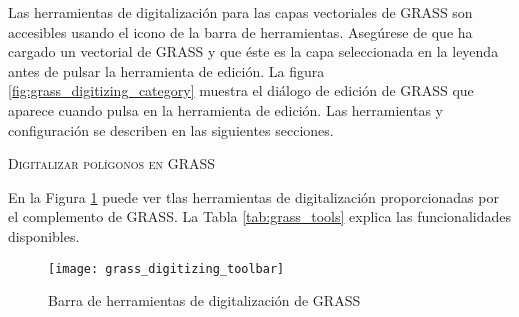 Las herramientas de digitalización para las capas vectoriales de GRASS son accesibles usando el icono  
de la barra de herramientas. Asegúrese de que ha cargado un vectorial de GRASS y que éste es la capa seleccionada en 
la leyenda antes de pulsar la herramienta de edición. La figura \ref{fig:grass_digitizing_category} muestra el diálogo
de edición de GRASS que aparece cuando pulsa en la herramienta de edición. Las herramientas y configuración se describen en las siguientes secciones.

\begin{Tip}\caption{\textsc{Digitalizar polígonos en GRASS}}
\end{Tip} 

\label{label_grasstoolbar}

En la Figura \ref{fig:grass_digitizing_toolbar} puede ver tlas herramientas de digitalización proporcionadas por el complemento de GRASS. La Tabla \ref{tab:grass_tools}
explica las funcionalidades disponibles.

\begin{figure}[h]
   \begin{center}
   \caption{Barra de herramientas de digitalización de GRASS \nixcaption}\label{fig:grass_digitizing_toolbar} 
   \texttt{[image: grass\_digitizing\_toolbar]}
\end{center}  
\end{figure}

